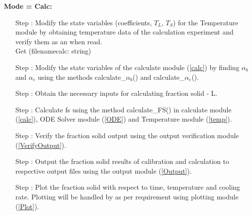 \documentclass[12pt, titlepage]{article}
\newcounter{stepnum} %
\begin{document}
\noindent
\textbf{Mode = Calc:}\\    

\begin{itemize}

\item[Step \refstepcounter{stepnum}\thestepnum \label{step_TempInCalc}:] Modify
  the state variables (coefficients, $T_L$, $T_S$) for the Temperature module by
  obtaining temperature data of the calculation experiment and verify them as an
  when read.\\

\noindent Get (filenamecalc: string)\\

\item[Step \refstepcounter{stepnum}\thestepnum \label{step_alpha}:] Modify the
  state variables of the calculate module (\ref{calc}) by finding $\alpha_b$ and
  $\alpha_e$ using the methods calculate\_$\alpha_b$() and
  calculate\_$\alpha_e$().

\item[Step \refstepcounter{stepnum}\thestepnum \label{step_InputL}:] Obtain the
  necessary inputs for calculating fraction solid - L.  

\item[Step \refstepcounter{stepnum}\thestepnum \label{step_fs}:]Calculate fs
  using the method calculate\_FS()   in calculate module (\ref{calc}), ODE Solver
  module (\ref{ODE}) and Temperature module (\ref{temp}).

\item[Step \refstepcounter{stepnum}\thestepnum \label{step_verifyOutput}:]
  Verify the fraction solid output using the output verification
  module (\ref{VerifyOutput}).

\item[Step \refstepcounter{stepnum}\thestepnum \label{step_output}:] Output the
  fraction solid results of calibration and calculation to respective output
  files using the output module (\ref{Output}).

\item[Step \refstepcounter{stepnum}\thestepnum \label{step_plot}:] Plot the
  fraction solid with respect to time, temperature and cooling rate.  Plotting
  will be handled by  as per
  requirement using plotting module (\ref{Plot}). 

\end{itemize}
\end{document}
